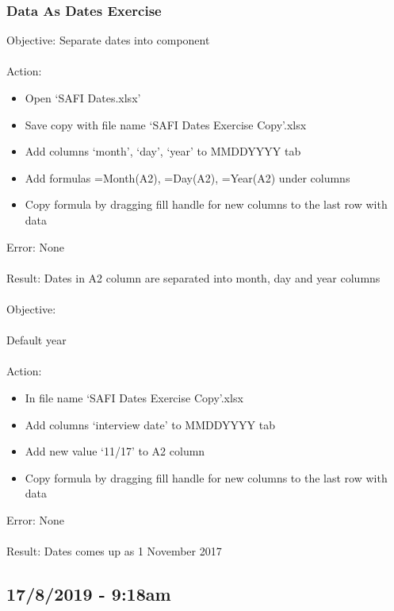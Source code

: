 \documentclass{article}
\begin{document}
\subsubsection*{Data As Dates Exercise}
Objective: Separate dates into component\\\\
Action:
\begin{itemize}
\item Open ‘SAFI Dates.xlsx’
\item Save copy with file name ‘SAFI Dates Exercise Copy’.xlsx
\item Add columns ‘month’, ‘day’, ‘year’  to MMDDYYYY tab
\item Add formulas =Month(A2), =Day(A2), =Year(A2) under columns
\item Copy formula by dragging fill handle for new columns to the last row with data
\end{itemize}
Error: None\\\\
Result: Dates in A2 column are separated into month, day and year columns\\\\
Objective:\\\\
Default year\\\\
Action:
\begin{itemize}
 \item In file name ‘SAFI Dates Exercise Copy’.xlsx
\item Add columns ‘interview date’  to MMDDYYYY tab
\item Add new value ‘11/17’ to A2 column
\item Copy formula by dragging fill handle for new columns to the last row with data
\end{itemize}
Error: None\\\\
Result: Dates comes up as 1 November 2017
\subsection*{17/8/2019 - 9:18am}
\end{document}

